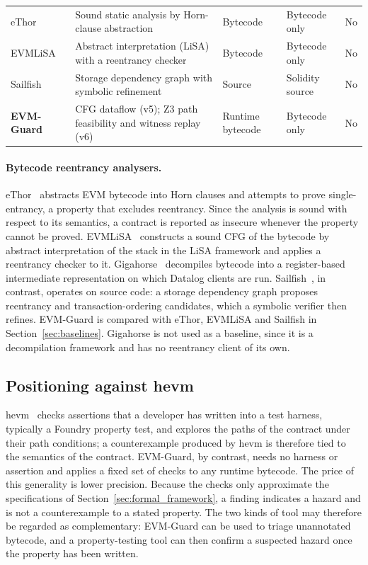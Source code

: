 \documentclass[pdflatex,sn-mathphys]{sn-jnl}
\theoremstyle{thmstyletwo}
\theoremstyle{thmstyletwo}
\begin{document}
\begin{table}[t]
{\begin{tabular}{@{}llllc@{}}
eThor~\cite{schneidewind2020ethor} & Sound static analysis by Horn-clause abstraction & Bytecode & Bytecode only & No \\
EVMLiSA~\cite{arceri2026evmlisa} & Abstract interpretation (LiSA) with a reentrancy checker & Bytecode & Bytecode only & No \\
Sailfish~\cite{bose2022sailfish} & Storage dependency graph with symbolic refinement & Source & Solidity source & No \\
\textbf{EVM-Guard} & CFG dataflow (v5); Z3 path feasibility and witness replay (v6) & Runtime bytecode & Bytecode only & No \\
\bottomrule
\end{tabular}%
}
\end{table}

\paragraph{Bytecode reentrancy analysers.} eThor~\cite{schneidewind2020ethor} abstracts EVM bytecode into Horn clauses and attempts to prove single-entrancy, a property that excludes reentrancy. Since the analysis is sound with respect to its semantics, a contract is reported as insecure whenever the property cannot be proved. EVMLiSA~\cite{arceri2026evmlisa} constructs a sound CFG of the bytecode by abstract interpretation of the stack in the LiSA framework and applies a reentrancy checker to it. Gigahorse~\cite{grech2019gigahorse} decompiles bytecode into a register-based intermediate representation on which Datalog clients are run. Sailfish~\cite{bose2022sailfish}, in contrast, operates on source code: a storage dependency graph proposes reentrancy and transaction-ordering candidates, which a symbolic verifier then refines. EVM-Guard is compared with eThor, EVMLiSA and Sailfish in Section~\ref{sec:baselines}. Gigahorse is not used as a baseline, since it is a decompilation framework and has no reentrancy client of its own.

\subsection{Positioning against hevm}\label{sec:gaps:hevm}
hevm~\cite{dxo2024hevm} checks assertions that a developer has written into a test harness, typically a Foundry property test, and explores the paths of the contract under their path conditions; a counterexample produced by hevm is therefore tied to the semantics of the contract. EVM-Guard, by contrast, needs no harness or assertion and applies a fixed set of checks to any runtime bytecode. The price of this generality is lower precision. Because the checks only approximate the specifications of Section~\ref{sec:formal_framework}, a finding indicates a hazard and is not a counterexample to a stated property. The two kinds of tool may therefore be regarded as complementary: EVM-Guard can be used to triage unannotated bytecode, and a property-testing tool can then confirm a suspected hazard once the property has been written.
\end{document}
